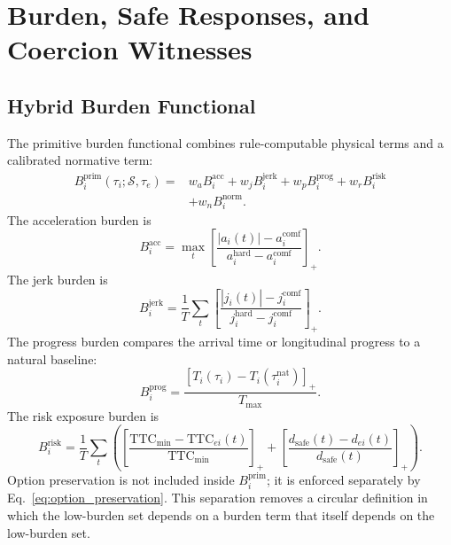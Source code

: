 \documentclass[10pt]{article}
\begin{document}
\section{Burden, Safe Responses, and Coercion Witnesses}
\label{app:burden_witness}

\subsection{Hybrid Burden Functional}
\label{app:burden}

The primitive burden functional combines rule-computable physical terms and a calibrated normative term:
\begin{equation}
\begin{aligned}
    B_i^{\mathrm{prim}}(\tau_i;\mathcal{S},\tau_e)
    =
    &
    w_a B^{\mathrm{acc}}_i
    +
    w_j B^{\mathrm{jerk}}_i
    +
    w_p B^{\mathrm{prog}}_i
    +
    w_r B^{\mathrm{risk}}_i \\
    &
    +
    w_n B^{\mathrm{norm}}_i .
\end{aligned}
\end{equation}
The acceleration burden is
\begin{equation}
    B^{\mathrm{acc}}_i
    =
    \max_t
    \left[
    \frac{|a_i(t)|-a^{\mathrm{comf}}_i}
    {a^{\mathrm{hard}}_i-a^{\mathrm{comf}}_i}
    \right]_+ .
\end{equation}
The jerk burden is
\begin{equation}
    B^{\mathrm{jerk}}_i
    =
    \frac{1}{T}
    \sum_t
    \left[
    \frac{|j_i(t)|-j^{\mathrm{comf}}_i}
    {j^{\mathrm{hard}}_i-j^{\mathrm{comf}}_i}
    \right]_+ .
\end{equation}
The progress burden compares the arrival time or longitudinal progress to a natural baseline:
\begin{equation}
    B^{\mathrm{prog}}_i
    =
    \frac{
    \left[
    T_i(\tau_i)-T_i(\tau_i^{\mathrm{nat}})
    \right]_+
    }{
    T_{\max}
    } .
\end{equation}
The risk exposure burden is
\begin{equation}
    B^{\mathrm{risk}}_i
    =
    \frac{1}{T}
    \sum_t
    \left(
    \left[
    \frac{\mathrm{TTC}_{\min}-\mathrm{TTC}_{ei}(t)}
    {\mathrm{TTC}_{\min}}
    \right]_+
    +
    \left[
    \frac{d_{\mathrm{safe}}(t)-d_{ei}(t)}
    {d_{\mathrm{safe}}(t)}
    \right]_+
    \right).
\end{equation}
Option preservation is not included inside $B_i^{\mathrm{prim}}$; it is enforced separately by Eq.~\eqref{eq:option_preservation}. This separation removes a circular definition in which the low-burden set depends on a burden term that itself depends on the low-burden set.
\end{document}
